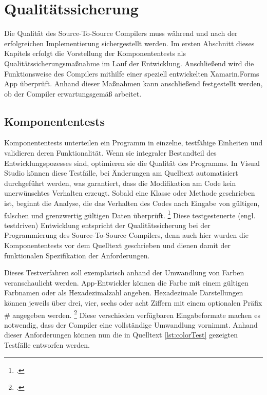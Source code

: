 \chapter{Qualitätssicherung}
\label{chap:Qualitätssicherung}
Die Qualität des Source-To-Source Compilers muss während und nach der erfolgreichen Implementierung sichergestellt werden.  Im ersten Abschnitt dieses Kapitels erfolgt die Vorstellung der Komponententests als Qualitätssicherungsmaßnahme im Lauf der Entwicklung.  Anschließend wird die Funktionsweise des Compilers mithilfe einer speziell entwickelten Xamarin.Forms App überprüft.  Anhand dieser Maßnahmen kann anschließend festgestellt werden,  ob der Compiler erwartungsgemäß arbeitet. 

\section{Komponententests}
Komponententests unterteilen ein Programm in einzelne,  testfähige Einheiten und validieren deren Funktionalität.  Wenn sie integraler Bestandteil des Entwicklungspozesses sind,  optimieren sie die Qualität des Programms.  In Visual Studio können diese Testfälle, bei Änderungen am Quelltext automatisiert durchgeführt 
werden, was garantiert, dass die Modifikation am Code kein unerwünschtes Verhalten erzeugt.   Sobald eine Klasse oder Methode geschrieben ist, beginnt die Analyse, die das Verhalten des Codes nach Eingabe von gültigen, falschen und grenzwertig gültigen Daten überprüft. \footcite[Vgl.][Abgerufen am \today]{MicrosoftColor}  Diese testgesteuerte (engl. testdriven) Entwicklung entspricht der Qualitätssicherung bei 
der Programmierung des Source-To-Source Compilers, denn auch hier wurden die Komponententests vor dem Quelltext geschrieben und dienen damit  der funktionalen Spezifikation der Anforderungen.

Dieses Testverfahren soll exemplarisch anhand der Umwandlung von Farben veranschaulicht 
werden.
App-Entwickler können die Farbe mit einem gültigen Farbnamen oder als Hexadezimalzahl 
angeben. Hexadezimale Darstellungen können jeweils über drei, vier, sechs oder acht Ziffern mit
einem optionalen Präfix \# angegeben werden.  \footcite[Vgl.][Abgerufen am \today]{MicrosoftColor} 
Diese verschieden verfügbaren Eingabeformate machen es notwendig, dass der Compiler eine 
vollständige Umwandlung vornimmt.  
Anhand dieser Anforderungen können nun die in Quelltext \ref{lst:colorTest} gezeigten Testfälle entworfen werden.



